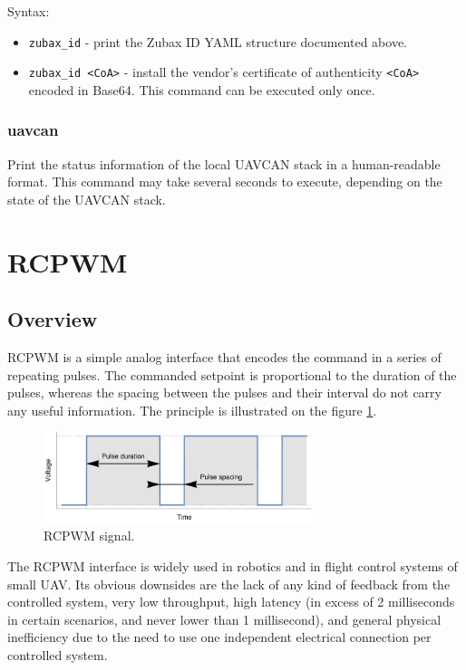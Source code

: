 \documentclass{zubaxdoc}
\begin{document}
Syntax:
\begin{itemize}
\item \verb|zubax_id| - print the Zubax ID YAML structure documented above.
\item \verb|zubax_id <CoA>| - install the vendor's certificate of authenticity \verb|<CoA>| encoded in Base64.
This command can be executed only once.
\end{itemize}

\subsubsection{uavcan}

Print the status information of the local UAVCAN stack in a human-readable format.
This command may take several seconds to execute, depending on the state of the UAVCAN stack.

\section{RCPWM}

\subsection{Overview}

RCPWM is a simple analog interface that encodes the command in a series of repeating pulses.
The commanded setpoint is proportional to the duration of the pulses,
whereas the spacing between the pulses and their interval do not carry any useful information.
The principle is illustrated on the figure \ref{rcpwm_signal_plot}.

\begin{figure}[hbt]
    \centering
	\includegraphics[width=0.7\textwidth]{rcpwm_signal_plot}
	\caption{RCPWM signal.
	\label{rcpwm_signal_plot}}
\end{figure}

The RCPWM interface is widely used in robotics and in flight control systems of small UAV.
Its obvious downsides are the lack of any kind of feedback from the controlled system,
very low throughput,
high latency (in excess of 2 milliseconds in certain scenarios, and never lower than 1 millisecond),
and general physical inefficiency due to the need to use one independent electrical connection
per controlled system.
\end{document}

